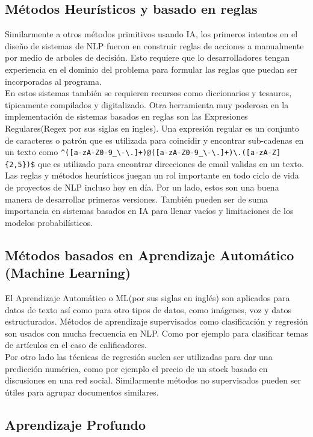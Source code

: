 \subsection{Métodos Heurísticos y basado en reglas}

Similarmente a otros métodos primitivos usando IA, los primeros intentos en el diseño de sistemas
de NLP fueron
en construir reglas de acciones a manualmente por medio de arboles de decisión. Esto requiere que
lo desarrolladores tengan
experiencia en el dominio
del problema para formular las reglas que puedan ser incorporadas al programa.\\
En estos sistemas también se requieren recursos como diccionarios y tesauros, típicamente
compilados y digitalizado. Otra
herramienta muy poderosa en la implementación de sistemas basados en reglas son las Expresiones
Regulares(Regex por sus
siglas en ingles). Una expresión regular es un conjunto de caracteres o patrón que es utilizada
para coincidir y
encontrar sub-cadenas en un texto como
\verb|^([a-zA-Z0-9_\-\.]+)@([a-zA-Z0-9_\-\.]+)\.([a-zA-Z]{2,5})$|
que es utilizado para encontrar direcciones de email validas en un texto.\\
Las reglas y métodos heurísticos juegan un rol importante en todo ciclo de vida de proyectos de NLP
incluso hoy en día. Por un lado, estos son una buena manera de desarrollar primeras versiones. También pueden ser de
suma importancia en
sistemas basados en IA para llenar vacíos y limitaciones de los modelos probabilísticos.
\cite{sowmya_practical_npl}

\subsection{Métodos basados en Aprendizaje Automático (Machine Learning)}
El Aprendizaje Automático o ML(por sus siglas en inglés) son aplicados para datos de texto así como
para otro tipos de datos, como imágenes, voz y datos estructurados. Métodos de aprendizaje
supervisados como clasificación y
regresión son usados con mucha frecuencia en NLP. Como por ejemplo para
clasificar temas de
artículos en el caso de calificadores.\\
Por otro lado las técnicas de regresión suelen ser utilizadas para dar una predicción numérica,
como por ejemplo el precio
de un stock basado en discusiones en una red social. Similarmente métodos no supervisados pueden ser
útiles para
agrupar documentos similares.
\subsection{Aprendizaje Profundo}

